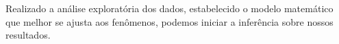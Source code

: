  
 \hspace*{1.25 cm} Realizado a análise exploratória dos dados, estabelecido o modelo matemático que melhor se ajusta aos  fenômenos, podemos iniciar a inferência sobre nossos resultados. 

